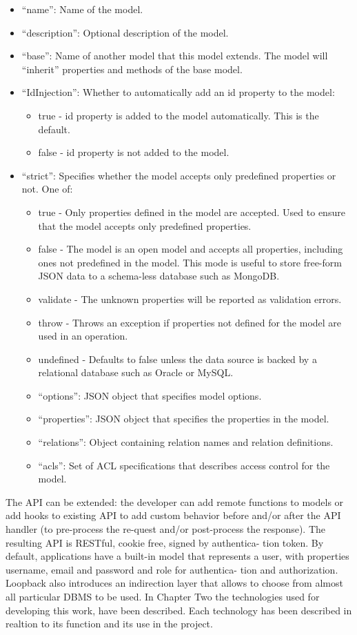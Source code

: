 \begin{itemize}
\item “name”: Name of the model.
\item “description”: Optional description of the model.
\item “base”: Name of another model that this model extends. The model will “inherit” properties and methods of the base model.
\item “IdInjection”: Whether to automatically add an id property to the model:
\begin{itemize}
\item true - id property is added to the model automatically. This is the default.
\item false - id property is not added to the model.
\end{itemize}
\item “strict”: Specifies whether the model accepts only predefined properties or not. One of:
\begin{itemize}
\item true - Only properties defined in the model are accepted. Used to ensure that the model accepts only predefined properties.
\item false - The model is an open model and accepts all properties, including ones not predefined in the model. This mode is useful to store free-form JSON data to a schema-less database such as MongoDB.
\item validate - The unknown properties will be reported as validation errors.
\item throw - Throws an exception if properties not defined for the model are used in an operation.
\item undefined - Defaults to false unless the data source is backed by a relational database such as Oracle or MySQL.
\item “options”: JSON object that specifies model options.
\item “properties”: JSON object that specifies the properties in the model.
\item “relations”: Object containing relation names and relation definitions.
\item “acls”: Set of ACL specifications that describes access control for the model.
\end{itemize}
\end{itemize}
The API can be extended: the developer can add remote functions to models or add hooks to existing API to add custom behavior before and/or after the API handler (to pre-process the re-quest and/or post-process the response). The resulting API is RESTful, cookie free, signed by authentica- tion token. By default, applications have a built-in model that represents a user, with properties username, email and password and role for authentica- tion and authorization. Loopback also introduces an indirection layer that allows to choose from almost all particular DBMS to be used.
In Chapter Two the technologies used for developing this work, have been described. Each technology has been described in realtion to its function and its use in the project.
